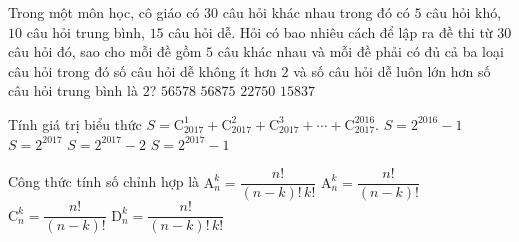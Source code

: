 \begin{ex}%
	Trong một môn học, cô giáo có $30$ câu hỏi khác nhau trong đó có $5$ câu hỏi khó, $10$ câu hỏi trung bình, $15$ câu hỏi dễ. Hỏi có bao nhiêu cách để lập ra đề thi từ $30$ câu hỏi đó, sao cho mỗi đề gồm $5$ câu khác nhau và mỗi đề phải có đủ cả ba loại câu hỏi trong đó số câu hỏi dễ không ít hơn $2$ và số câu hỏi dễ luôn lớn hơn số câu hỏi trung bình là $2$?
	\choice
	{$56578$} 
	{$56875$}
	{\True $22750$}
	{$15837$}
\end{ex}
\begin{ex}%
	Tính giá trị biểu thức $S=\mathrm{C}_{2017}^{1}+\mathrm{C}_{2017}^{2}+\mathrm{C}_{2017}^{3}+\cdots+\mathrm{C}_{2017}^{2016}$.
	\choice
	{$S=2^{2016}-1$} 
	{$S=2^{2017}$}
	{\True $S=2^{2017}-2$}
	{$S=2^{2017}-1$}
\end{ex}
\begin{ex}%
	Công thức tính số chỉnh hợp là
	\choice
	{$\mathrm{A}_{n}^{k}=\dfrac{n!}{(n-k)!\,k!}$} 
	{\True $\mathrm{A}_{n}^{k}=\dfrac{n!}{(n-k)!}$}
	{$\mathrm{C}_{n}^{k}=\dfrac{n!}{(n-k)!}$}
	{$\mathrm{D}_{n}^{k}=\dfrac{n!}{(n-k)!\,k!}$}
\end{ex}
